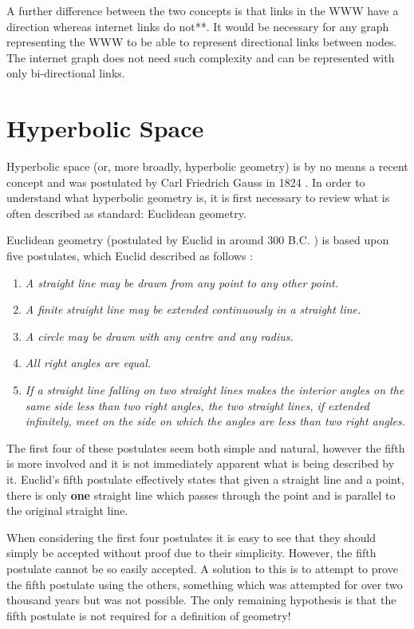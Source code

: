 A further difference between the two concepts is that links in the WWW have a direction whereas internet links do not**. It would be necessary for any graph representing the WWW to be able to represent directional links between nodes.  The internet graph does not need such complexity and can be represented with only bi-directional links. 

\section{Hyperbolic Space}
\label{sec:LitReviewHyperbolicSpace}

Hyperbolic space (or, more broadly, hyperbolic geometry) is by no means a recent concept and was postulated by Carl Friedrich Gauss in 1824 \cite{ratcliffe_foundations_2006}. In order to understand what hyperbolic geometry is, it is first necessary to review what is often described as standard: Euclidean geometry.

Euclidean geometry (postulated by Euclid in around 300 B.C. \cite{ratcliffe_foundations_2006}) is based upon five postulates, which Euclid described as follows \cite{ratcliffe_foundations_2006}:
\begin{enumerate}
\item \textit{A straight line may be drawn from any point to any other point.}
\item \textit{A finite straight line may be extended continuously in a straight line.}
\item \textit{A circle may be drawn with any centre and any radius.}
\item \textit{All right angles are equal.}
\item \textit{If a straight line falling on two straight lines makes the interior angles on the same side less than two right angles, the two straight lines, if extended infinitely, meet on the side on which the angles are less than two right angles.}
\end{enumerate}

The first four of these postulates seem both simple and natural, however the fifth is more involved and it is not immediately apparent what is being described by it. Euclid's fifth postulate effectively states that given a straight line and a point, there is only \textbf{one} straight line which passes through the point and is parallel to the original straight line. 

When considering the first four postulates it is easy to see that they should simply be accepted without proof due to their simplicity. However, the fifth postulate cannot be so easily accepted. A solution to this is to attempt to prove the fifth postulate using the others, something which was attempted for over two thousand years \cite{ratcliffe_foundations_2006} but was not possible. The only remaining hypothesis is that the fifth postulate is not required for a definition of geometry!

